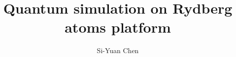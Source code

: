 \documentclass[11pt, letterpaper, twoside]{book}
\title{Quantum simulation on Rydberg atoms platform}
\begin{document}
\author{Si-Yuan Chen}
\maketitle


\tableofcontents
\newpage

% 
% 





\printbibliography

\end{document}
